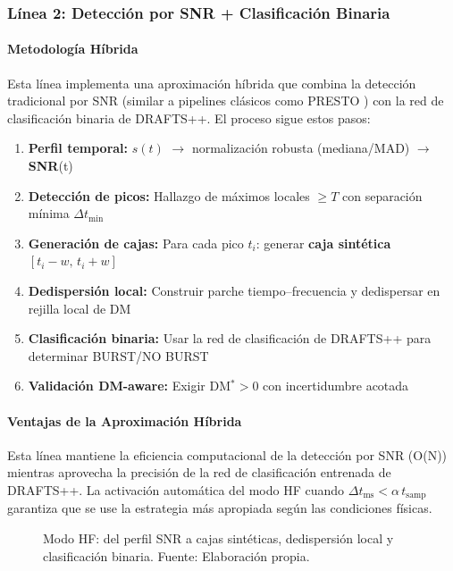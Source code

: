 \subsubsection{Línea 2: Detección por SNR + Clasificación Binaria}

\paragraph{Metodología Híbrida}

Esta línea implementa una aproximación híbrida que combina la detección tradicional por SNR (similar a pipelines clásicos como PRESTO \cite{ransom_presto}) con la red de clasificación binaria de DRAFTS++. El proceso sigue estos pasos:

\begin{enumerate}
\item \textbf{Perfil temporal:} $s(t)$ $\rightarrow$ normalización robusta (mediana/MAD) $\rightarrow$ \textbf{SNR}(t)
\item \textbf{Detección de picos:} Hallazgo de máximos locales $\ge T$ con separación mínima $\Delta t_{\min}$
\item \textbf{Generación de cajas:} Para cada pico $t_i$: generar \textbf{caja sintética} $[t_i-w,\, t_i+w]$
\item \textbf{Dedispersión local:} Construir parche tiempo--frecuencia y dedispersar en rejilla local de DM
\item \textbf{Clasificación binaria:} Usar la red de clasificación de DRAFTS++ para determinar BURST/NO BURST
\item \textbf{Validación DM-aware:} Exigir DM$^\ast\!>\!0$ con incertidumbre acotada
\end{enumerate}

\paragraph{Ventajas de la Aproximación Híbrida}

Esta línea mantiene la eficiencia computacional de la detección por SNR (O(N)) mientras aprovecha la precisión de la red de clasificación entrenada de DRAFTS++. La activación automática del modo HF cuando $\Delta t_{\mathrm{ms}} < \alpha\, t_{\mathrm{samp}}$ garantiza que se use la estrategia más apropiada según las condiciones físicas.

\begin{figure}[H] 
\centering 
\caption{\label{fig:hf} Modo HF: del perfil SNR a cajas sintéticas, dedispersión local y clasificación binaria. Fuente: Elaboración propia.} 
\end{figure}

